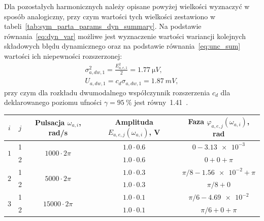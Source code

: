 Dla pozostałych harmonicznych należy opisane powyżej wielkości wyznaczyć w sposób analogiczny, przy czym wartości tych wielkości zestawiono w tabeli~\ref{tab:sym_parta_params_dyn_summary}. Na podstawie równania~\eqref{eq:dyn_var} możliwe jest wyznaczenie wartości wariancji kolejnych składowych błędu dynamicznego oraz na podstawie równania~\eqref{eq:unc_sum} wartości ich niepewności rozszerzonej:
\begin{gather}
\sigma_{a,dw,1}^{2} = \frac{E_{a,e,1}^{2}}{2} = \qty{1.77}{\micro V} \label{eq:sym_parta_dyn_self_var}, \\
U_{a,dw,1} = c_{d} \sigma_{a,dw,1} = \qty{1.87}{mV} \label{eq:sym_parta_dyn_self_unc},
\end{gather}
przy czym dla rozkładu dwumodalnego współczynnik rozszerzenia $c_{d}$ dla deklarowanego poziomu ufności $\gamma = \qty{95}{\percent}$ jest równy~\num{1.41}~\cite{jakubiec_system, jcgm_guide}.

\begin{table}[htb!]
\begin{tabular}[c]{| c | c | c | c | c |} \hline
\textbf{$i$} & \textbf{$j$} & \textbf{Pulsacja $\omega_{a,i}$, rad/s} & \textbf{Amplituda $E_{a,e,j}(\omega_{a,i})$, V} & \textbf{Faza $\varphi_{a,e,j}(\omega_{a,i})$, rad} \\ \hline
\multirow{2}{*}{$1$} & 1 & \multirow{2}{*}{$1000  \cdot 2\pi$} &  $\num{1.0} \cdot \num{0.6}$ & $0 - \num{3.13e-3}$            \\ \cline{2-2} \cline{4-5}
                     & 2 &                                     &  $\num{1.0} \cdot \num{0.6}$ & $0 + 0 + \pi$                  \\ \hline
\multirow{2}{*}{$2$} & 1 & \multirow{2}{*}{$5000  \cdot 2\pi$} &  $\num{1.0} \cdot \num{0.3}$ & $\pi/8 - \num{1.56e-2} + \pi$  \\ \cline{2-2} \cline{4-5}
                     & 2 &                                     &  $\num{1.0} \cdot \num{0.3}$ & $\pi/8 + 0$                    \\ \hline
\multirow{2}{*}{$3$} & 1 & \multirow{2}{*}{$15000 \cdot 2\pi$} &  $\num{1.0} \cdot \num{0.1}$ & $\pi/6 - \num{4.69e-2}$        \\ \cline{2-2} \cline{4-5}
                     & 2 &                                     &  $\num{1.0} \cdot \num{0.1}$ & $\pi/6 + 0 + \pi$              \\ \hline
\end{tabular}
\end{table}

